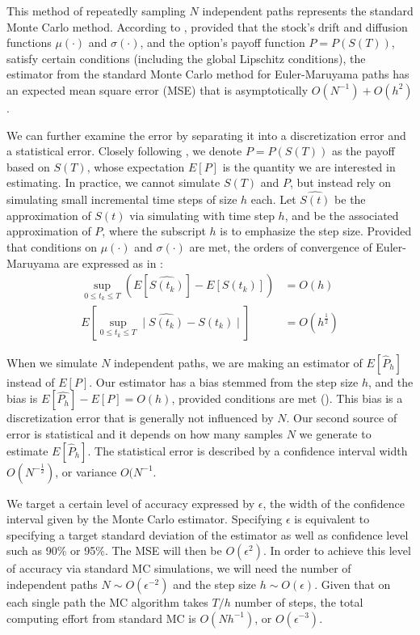 \documentclass{article}
\begin{document}
    This method of repeatedly sampling $N$ independent paths represents the standard Monte Carlo method. According to \cite{giles08}, provided that the stock's drift and diffusion functions $\mu(\cdot)$ and $\sigma(\cdot)$, and the option's payoff function $P=P(S(T))$, satisfy certain conditions (including the global Lipschitz conditions), the estimator from the standard Monte Carlo method for Euler-Maruyama paths has an expected mean square error (MSE) that is asymptotically $O(N^{-1}) + O(h^2)$. 
    
	We can further examine the error by separating it into a discretization error and a statistical error. Closely following \cite{giles08}, we denote $P=P(S(T))$ as the payoff based on $S(T)$, whose expectation $E[P]$ is the quantity we are interested in estimating. In practice, we cannot simulate $S(T)$ and $P$, but instead rely on simulating small incremental time steps of size $h$ each. Let $\widehat{S(t)}$ be the approximation of $S(t)$ via simulating with time step $h$, and  be the associated approximation of $P$, where the subscript $h$ is to emphasize the step size. Provided that conditions on $\mu(\cdot)$ and $\sigma(\cdot)$ are met, the orders of convergence of Euler-Maruyama are expressed as in \cite{higham15}:
	\begin{align*}
	\sup_{0 \leq t_k \leq T} (E[\widehat{S(t_k)}] - E[S(t_k)]) &= O(h) \\
	E[\sup_{0 \leq t_k \leq T}\mid \widehat{S(t_k)} - S(t_k)\mid ] &= O(h^{\frac{1}{2}})
	\end{align*}
    
	When we simulate $N$ independent paths, we are making an estimator of $E[\widehat{P}_h]$ instead of $E[P]$. Our estimator has a bias stemmed from the step size $h$, and the bias is $E[\widehat{P_h}] - E[P] = O(h)$, provided conditions are met (\cite{higham15}). This bias is a discretization error that is generally not influenced by $N$. Our second source of error is statistical and it depends on how many samples $N$ we generate to estimate $E[\widehat{P}_h]$. The statistical error is described by a confidence interval width $O(N^{-\frac{1}{2}})$, or variance $O(N^{-1}$.
	
    We target a certain level of accuracy expressed by $\epsilon$, the width of the confidence interval given by the Monte Carlo estimator. Specifying $\epsilon$ is equivalent to specifying a target standard deviation of the estimator as well as confidence level such as 90\% or 95\%. The MSE will then be $O(\epsilon^2)$. In order to achieve this level of accuracy via standard MC simulations, we will need the number of independent paths $N \sim O(\epsilon^{-2})$ and the step size $h \sim O(\epsilon)$. Given that on each single path the MC algorithm takes $T/h$ number of steps, the total computing effort from standard MC is $O(Nh^{-1})$, or $O(\epsilon^{-3})$. 
    
\end{document}
